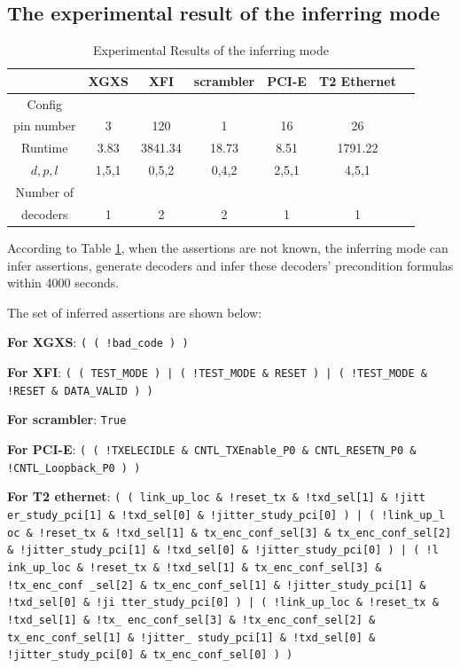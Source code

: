 \documentclass[runningheads,a4paper]{llncs}
\begin{document}
\subsection{The experimental result of the inferring mode}
\begin{table}[b]
\centering
\caption{Experimental Results of the inferring mode}
\begin{tabular}{|c|c|c|c|c|c|c|}
\hline
                                        &XGXS     &XFI       &scrambler     &PCI-E    &T2 Ethernet\\\hline\hline
Config                 &&&&&\\
pin number                              &3        &120       &1             &16      &26\\\hline
Runtime                                 &3.83     &3841.34   &18.73         &8.51    &1791.22      \\\hline
$d,p,l$                                 &1,5,1    &0,5,2     &0,4,2         &2,5,1   &4,5,1          \\ \hline
Number of                               &&&&&          \\
decoders                                &1        &2         &2             &1       &1          \\ \hline
\end{tabular}\label{tab_res}
\end{table}

According to Table 	\ref{tab_res},
when the assertions are not known,
the inferring mode can infer assertions, generate decoders and infer these decoders' precondition formulas within 4000 seconds.

The set of inferred assertions are shown below:

\textbf{For XGXS}:
\texttt{( ( !bad\_code ) )}

\textbf{For XFI}:
\texttt{( ( TEST\_MODE ) | ( !TEST\_MODE \& RESET ) | ( !TEST\_MODE \& !RESET \& DATA\_VALID ) )}

\textbf{For scrambler}:
\texttt{True}

\textbf{For PCI-E}:
\texttt{( ( !TXELECIDLE \& CNTL\_TXEnable\_P0 \& CNTL\_RESETN\_P0 \& !CNTL\_Loopback\_P0 ) )}

\textbf{For T2 ethernet}:
\texttt{( ( link\_up\_loc \& !reset\_tx \& !txd\_sel[1] \& !jitt er\_study\_pci[1] \& !txd\_sel[0] \& !jitter\_study\_pci[0] ) | ( !link\_up\_l oc \& !reset\_tx \& !txd\_sel[1] \& tx\_enc\_conf\_sel[3] \& tx\_enc\_conf\_sel[2] \& !jitter\_study\_pci[1] \& !txd\_sel[0] \& !jitter\_study\_pci[0] ) | ( !l ink\_up\_loc \& !reset\_tx \& !txd\_sel[1] \& tx\_enc\_conf\_sel[3] \& !tx\_enc\_conf \_sel[2] \& tx\_enc\_conf\_sel[1] \& !jitter\_study\_pci[1] \& !txd\_sel[0] \& !ji tter\_study\_pci[0] ) | ( !link\_up\_loc \& !reset\_tx \& !txd\_sel[1] \& !tx\_ enc\_conf\_sel[3] \& !tx\_enc\_conf\_sel[2] \& tx\_enc\_conf\_sel[1] \& !jitter\_ study\_pci[1] \& !txd\_sel[0] \& !jitter\_study\_pci[0] \& tx\_enc\_conf\_sel[0] ) )}
\end{document}
